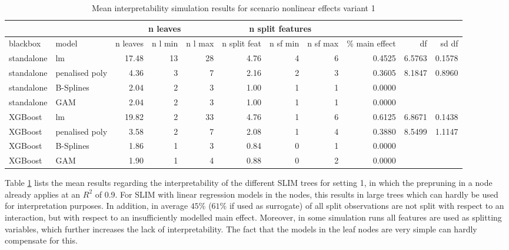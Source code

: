 \begin{table}[!htb]
\centering \tiny
\begin{tabular}[t]{l|l|r|r|r|r|r|r|r|r|r}
\hline
\multicolumn{2}{c}{} & \multicolumn{3}{|c}{n leaves} & \multicolumn{3}{|c|}{n split features} & \multicolumn{2}{c}{}   \\

\hline
blackbox & model & n leaves & n l min & n l max & n split feat & n sf min & n sf max & \% main effect & df & sd df\\
\hline
standalone & lm & 17.48 & 13 & 28 & 4.76 & 4 & 6 & 0.4525 & 6.5763 & 0.1578\\
standalone & penalised poly & 4.36 & 3 & 7 & 2.16 & 2 & 3 & 0.3605 & 8.1847 & 0.8960\\
standalone & B-Splines & 2.04 & 2 & 3 & 1.00 & 1 & 1 & 0.0000 &  & \\
standalone & GAM & 2.04 & 2 & 3 & 1.00 & 1 & 1 & 0.0000 &  & \\
\hline
XGBoost & lm & 19.82 & 2 & 33 & 4.76 & 1 & 6 & 0.6125 & 6.8671 & 0.1438\\
XGBoost & penalised poly & 3.58 & 2 & 7 & 2.08 & 1 & 4 & 0.3880 & 8.5499 & 1.1147\\
XGBoost & B-Splines & 1.86 & 1 & 3 & 0.84 & 0 & 1 & 0.0000 &  & \\
XGBoost & GAM & 1.90 & 1 & 4 & 0.88 & 0 & 2 & 0.0000 &  & \\

\hline
\end{tabular}
\caption{Mean interpretability simulation results for scenario nonlinear effects variant 1}
\label{tab:linear_mixed_1_interpretability}

\end{table}

Table \ref{tab:linear_mixed_1_interpretability} lists the mean results regarding the interpretability of the different SLIM trees for setting 1, in which the prepruning in a node already applies at an $R^2$ of 0.9. For SLIM with linear regression models in the nodes, this results in large trees which can hardly be used for interpretation purposes.
In addition, in average $45\%$ ($61\%$ if used as surrogate) of all split observations are not split with respect to an interaction, but with respect to an insufficiently modelled main effect. Moreover, in some simulation runs all features are used as splitting variables, which further increases the lack of interpretability.
The fact that the models in the leaf nodes are very simple can hardly compensate for this. 

